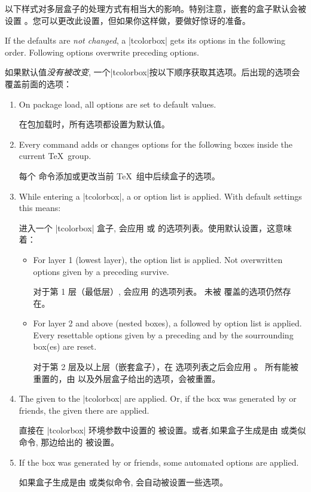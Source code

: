 以下样式对多层盒子的处理方式有相当大的影响。特别注意，嵌套的盒子默认会被设置  。您可以更改此设置，但如果你这样做，要做好惊讶的准备。

If the defaults are \emph{not changed}, a |tcolorbox| gets its options
in the following order. Following options overwrite preceding options.

如果默认值\emph{没有被改变}, 一个|tcolorbox|按以下顺序获取其选项。后出现的选项会覆盖前面的选项：


\begin{enumerate}
\item  On package load, all options are set to default values.

在包加载时，所有选项都设置为默认值。
\item Every  command adds or changes options for the following boxes inside the current \TeX\ group.

每个  命令添加或更改当前 \TeX\ 组中后续盒子的选项。
\item 
While entering a |tcolorbox|, a  or   option list is applied.  With default settings this means:

进入一个 |tcolorbox| 盒子, 会应用  或   的选项列表。使用默认设置，这意味着：
\begin{itemize}
\item %
For layer 1 (lowest layer), the  option list is applied.
  Not overwritten options given by a preceding  survive.

  对于第 1 层（最低层）, 会应用  的选项列表。%
未被  覆盖的选项仍然存在。
\item 
For layer 2 and above (nested boxes), a  followed by  option list is applied.  Every resettable options given by a preceding  and by the sourrounding box(es) are reset.

对于第 2 层及以上层（嵌套盒子），在  选项列表之后会应用 。 所有能被重置的，由  以及外层盒子给出的选项，会被重置。
\end{itemize}
\item 
The  given to the |tcolorbox| are applied.
  Or, if the box was generated by  or friends,
  the  given there are applied.

  直接在 |tcolorbox| 环境参数中设置的  被设置。或者,如果盒子生成是由  或类似命令, 那边给出的  被设置。
\item 
If the box was generated by  or friends,  some automated options are applied.

如果盒子生成是由  或类似命令, 会自动被设置一些选项。
\end{enumerate}


